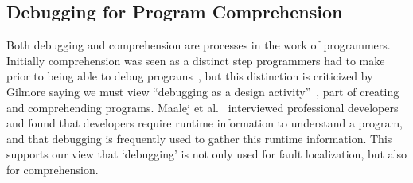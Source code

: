 

\subsection{Debugging for Program Comprehension}
Both debugging and comprehension are processes in the work of programmers.
Initially comprehension was seen as a distinct step programmers had to make
prior to being able to debug programs~\cite{katz1987debugging}, 
but this distinction is criticized by Gilmore saying we must view 
``debugging as a design activity''~\cite{gilmore1991models}, 
part of creating and comprehending programs. 
Maalej et al.~\cite{Maalej2014} interviewed professional developers 
and found that developers require runtime information to understand a program,
and that debugging is frequently used to gather this runtime information.
This supports our view that `debugging' is not only used for fault localization,
but also for comprehension.


